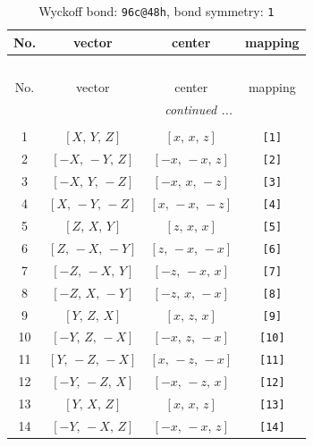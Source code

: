 \documentclass[fleqn,8pt]{jsarticle}
\begin{document}
\begin{longtable}{cccc}
\caption{Wyckoff bond: {\tt 96c@48h}, bond symmetry: {\tt 1}}
 \\
 \hline \hline
No. & vector & center & mapping \\ \hline \endfirsthead

\multicolumn{3}{l}{\tablename\ \thetable{}} \\
 \hline \hline
No. & vector & center & mapping \\ \hline \endhead

 \hline \hline
\multicolumn{3}{r}{\footnotesize\it continued ...} \\ \endfoot

 \hline \hline
\multicolumn{3}{r}{} \\ \endlastfoot

1 & $\left[ X,\, Y,\, Z \right]$ & $\left[ x,\, x,\, z \right]$ & {\tt [1]} \\ \hline
2 & $\left[ - X,\, - Y,\, Z \right]$ & $\left[ - x,\, - x,\, z \right]$ & {\tt [2]} \\ \hline
3 & $\left[ - X,\, Y,\, - Z \right]$ & $\left[ - x,\, x,\, - z \right]$ & {\tt [3]} \\ \hline
4 & $\left[ X,\, - Y,\, - Z \right]$ & $\left[ x,\, - x,\, - z \right]$ & {\tt [4]} \\ \hline
5 & $\left[ Z,\, X,\, Y \right]$ & $\left[ z,\, x,\, x \right]$ & {\tt [5]} \\ \hline
6 & $\left[ Z,\, - X,\, - Y \right]$ & $\left[ z,\, - x,\, - x \right]$ & {\tt [6]} \\ \hline
7 & $\left[ - Z,\, - X,\, Y \right]$ & $\left[ - z,\, - x,\, x \right]$ & {\tt [7]} \\ \hline
8 & $\left[ - Z,\, X,\, - Y \right]$ & $\left[ - z,\, x,\, - x \right]$ & {\tt [8]} \\ \hline
9 & $\left[ Y,\, Z,\, X \right]$ & $\left[ x,\, z,\, x \right]$ & {\tt [9]} \\ \hline
10 & $\left[ - Y,\, Z,\, - X \right]$ & $\left[ - x,\, z,\, - x \right]$ & {\tt [10]} \\ \hline
11 & $\left[ Y,\, - Z,\, - X \right]$ & $\left[ x,\, - z,\, - x \right]$ & {\tt [11]} \\ \hline
12 & $\left[ - Y,\, - Z,\, X \right]$ & $\left[ - x,\, - z,\, x \right]$ & {\tt [12]} \\ \hline
13 & $\left[ Y,\, X,\, Z \right]$ & $\left[ x,\, x,\, z \right]$ & {\tt [13]} \\ \hline
14 & $\left[ - Y,\, - X,\, Z \right]$ & $\left[ - x,\, - x,\, z \right]$ & {\tt [14]} \\ \hline

\end{longtable}
\end{document}
